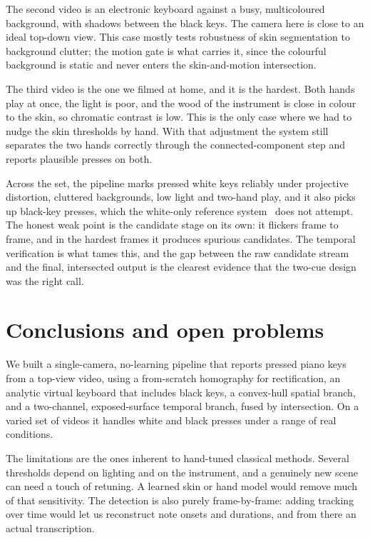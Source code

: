 \documentclass[11pt]{article}
\begin{document}
The second video is an electronic keyboard against a busy, multicoloured
background, with shadows between the black keys. The camera here is close to an
ideal top-down view. This case mostly tests robustness of skin segmentation to
background clutter; the motion gate is what carries it, since the colourful
background is static and never enters the skin-and-motion intersection.

The third video is the one we filmed at home, and it is the hardest. Both hands
play at once, the light is poor, and the wood of the instrument is close in colour
to the skin, so chromatic contrast is low. This is the only case where we had to
nudge the skin thresholds by hand. With that adjustment the system still
separates the two hands correctly through the connected-component step and reports
plausible presses on both.

Across the set, the pipeline marks pressed white keys reliably under projective
distortion, cluttered backgrounds, low light and two-hand play, and it also picks
up black-key presses, which the white-only reference system~\cite{digennaro2026visual} does not attempt. The
honest weak point is the candidate stage on its own: it flickers frame to frame,
and in the hardest frames it produces spurious candidates. The temporal
verification is what tames this, and the gap between the raw candidate stream and
the final, intersected output is the clearest evidence that the two-cue design
was the right call. \newpage

\section{Conclusions and open problems}
We built a single-camera, no-learning pipeline that reports pressed piano keys
from a top-view video, using a from-scratch homography for rectification, an
analytic virtual keyboard that includes black keys, a convex-hull spatial branch,
and a two-channel, exposed-surface temporal branch, fused by intersection. On a varied set
of videos it handles white and black presses under a range of real conditions.

The limitations are the ones inherent to hand-tuned classical methods. Several
thresholds depend on
lighting and on the instrument, and a genuinely new scene can need a touch of
retuning. A learned skin or hand model would remove much of that sensitivity. The detection is also purely
frame-by-frame: adding tracking over time would let us reconstruct note onsets
and durations, and from there an actual transcription.





\end{document}
